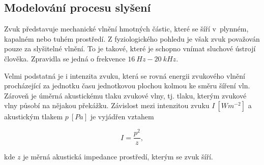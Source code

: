 

\subsection{Modelování procesu slyšení}
\label{chap:asr:parametrization:hearing}

Zvuk představuje mechanické vlnění hmotných částic, které se šíří v~plynném, kapalném nebo tuhém prostředí.
Z fyziologického pohledu je však zvuk považován pouze za slyšitelné vlnění.
To je takové, které je schopno vnímat sluchové ústrojí člověka. Zpravidla se jedná o frekvence $16\ Hz - 20\ kHz$.

Velmi podstatná je i intenzita zvuku, která se rovná energii zvukového vlnění procházející za jednotku času jednotkovou plochou kolmou ke směru šíření vln. Zároveň je úměrná akustickému tlaku zvukové vlny, tj. tlaku, kterým zvukové vlny působí na nějakou překážku.
Závislost mezi intenzitou zvuku $I\ \left[Wm^{-2}\right]$ a akustickým tlakem $p\ \left[Pa\right]$ je vyjádřen vztahem

\begin{equation}
  I = \frac{p^{2}}{z},
  \label{eq:asr:mfcc:intesity}
\end{equation}

\noindent kde $z$ je měrná akustická impedance prostředí, kterým se zvuk šíří.


